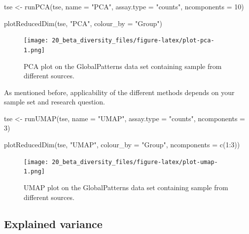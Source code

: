 \documentclass[
]{book}
\newenvironment{Shaded}{\begin{snugshade}}{\end{snugshade}}
\newcommand{\AttributeTok}[1]{\textcolor[rgb]{0.77,0.63,0.00}{#1}}
\newcommand{\DecValTok}[1]{\textcolor[rgb]{0.00,0.00,0.81}{#1}}
\newcommand{\FunctionTok}[1]{\textcolor[rgb]{0.00,0.00,0.00}{#1}}
\newcommand{\NormalTok}[1]{#1}
\newcommand{\OtherTok}[1]{\textcolor[rgb]{0.56,0.35,0.01}{#1}}
\newcommand{\SpecialCharTok}[1]{\textcolor[rgb]{0.00,0.00,0.00}{#1}}
\newcommand{\StringTok}[1]{\textcolor[rgb]{0.31,0.60,0.02}{#1}}
\begin{document}
\begin{Shaded}
\begin{Highlighting}[]
\NormalTok{tse }\OtherTok{\textless{}{-}} \FunctionTok{runPCA}\NormalTok{(tse,}
              \AttributeTok{name =} \StringTok{"PCA"}\NormalTok{,}
              \AttributeTok{assay.type =} \StringTok{"counts"}\NormalTok{,}
              \AttributeTok{ncomponents =} \DecValTok{10}\NormalTok{)}

\FunctionTok{plotReducedDim}\NormalTok{(tse, }\StringTok{"PCA"}\NormalTok{,}
               \AttributeTok{colour\_by =} \StringTok{"Group"}\NormalTok{)}
\end{Highlighting}
\end{Shaded}

\begin{figure}
\centering
\texttt{[image: 20\_beta\_diversity\_files/figure-latex/plot-pca-1.png]}
\caption{\label{fig:plot-pca}PCA plot on the GlobalPatterns data set containing sample from different sources.}
\end{figure}

As mentioned before, applicability of the different methods depends on your
sample set and research question.

\begin{Shaded}
\begin{Highlighting}[]
\NormalTok{tse }\OtherTok{\textless{}{-}} \FunctionTok{runUMAP}\NormalTok{(tse,}
               \AttributeTok{name =} \StringTok{"UMAP"}\NormalTok{,}
               \AttributeTok{assay.type =} \StringTok{"counts"}\NormalTok{,}
               \AttributeTok{ncomponents =} \DecValTok{3}\NormalTok{)}

\FunctionTok{plotReducedDim}\NormalTok{(tse, }\StringTok{"UMAP"}\NormalTok{,}
               \AttributeTok{colour\_by =} \StringTok{"Group"}\NormalTok{,}
               \AttributeTok{ncomponents =} \FunctionTok{c}\NormalTok{(}\DecValTok{1}\SpecialCharTok{:}\DecValTok{3}\NormalTok{))}
\end{Highlighting}
\end{Shaded}

\begin{figure}
\centering
\texttt{[image: 20\_beta\_diversity\_files/figure-latex/plot-umap-1.png]}
\caption{\label{fig:plot-umap}UMAP plot on the GlobalPatterns data set containing sample from different sources.}
\end{figure}

\hypertarget{explained-variance}{%
\subsection{Explained variance}\label{explained-variance}}
\end{document}
